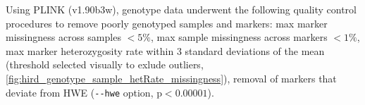 Using PLINK (v1.90b3w), genotype data underwent the following quality control procedures to remove poorly genotyped samples and markers:
max marker missingness across samples $< 5\%$, 
max sample missingness across markers $< 1\%$, 
max marker heterozygosity rate within 3 standard deviations of the mean (threshold selected visually to exlude outliers, \cref{fig:hird_genotype_sample_hetRate_missingness}),
removal of markers that deviate from \gls{HWE} (\texttt{-{}-hwe} option, $\text{p} < 0.00001$).
  

